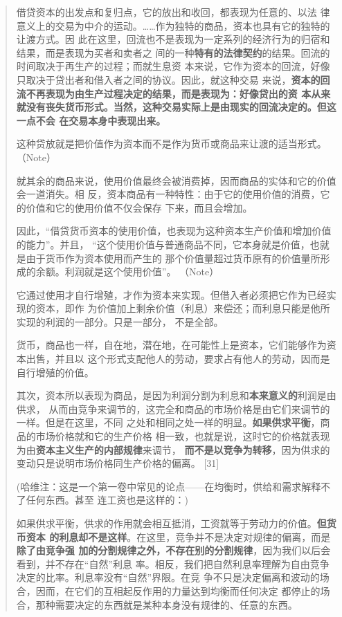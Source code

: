 \begin{quotation}借贷资本的出发点和复归点，它的放出和收回，都表现为任意的、以法
律意义上的交易为中介的运动。……作为独特的商品，资本也具有它的独特的让渡方式。因
此在这里，回流也不是表现为一定系列的经济行为的归宿和结果，而是表现为买者和卖者之
间的一种\textbf{特有的法律契约}的结果。回流的时间取决于再生产的过程；而就生息资
本来说，它作为资本的回流，好像只取决于贷出者和借入者之间的协议。因此，就这种交易
来说，\textbf{资本的回流不再表现为由生产过程决定的结果，而是表现为：好像贷出的资
本从来就没有丧失货币形式。当然，这种交易实际上是由现实的回流决定的。但这一点不会
在交易本身中表现出来。}

这种贷放就是把价值作为资本而不是作为货币或商品来让渡的适当形式。（Note）

就其余的商品来说，使用价值最终会被消费掉，因而商品的实体和它的价值会一道消失。相
反，资本商品有一种特性：由于它的使用价值的消费，它的价值和它的使用价值不仅会保存
下来，而且会增加。

因此，“借贷货币资本的使用价值，也表现为这种资本生产价值和增加价值的能力”。并且，
“这个使用价值与普通商品不同，它本身就是价值，也就是由于货币作为资本使用而产生的
那个价值量超过货币原有的价值量所形成的余额。利润就是这个使用价值”。
 （Note）

它通过使用才自行增殖，才作为资本来实现。但借入者必须把它作为已经实现的资本，即作
为价值加上剩余价值（利息）来偿还；而利息只能是他所实现的利润的一部分。只是一部分，
不是全部。

货币，商品也一样，自在地，潜在地，在可能性上是资本，它们能够作为资本出售，并且以
这个形式支配他人的劳动，要求占有他人的劳动，因而是自行增殖的价值。

其次，资本所以表现为商品，是因为利润分割为利息和\textbf{本来意义的}利润是由供求，
从而由竞争来调节的，这完全和商品的市场价格是由它们来调节的一样。但是在这里，不同
之处和相同之处一样的明显。\textbf{如果供求平衡}，商品的市场价格就和它的生产价格
相一致，也就是说，这时它的价格就表现为由\textbf{资本主义生产的内部规律}来调节，
\textbf{而不是以竞争为转移}，因为供求的变动只是说明市场价格同生产价格的偏离。
[31]

(哈维注：这是一个第一卷中常见的论点——在均衡时，供给和需求解释不了任何东西。甚至
连工资也是这样的：)

如果供求平衡，供求的作用就会相互抵消，工资就等于劳动力的价值。\textbf{但货币资本
的利息却不是这样}。在这里，竞争并不是决定对规律的偏离，而是\textbf{除了由竞争强
加的分割规律之外，不存在别的分割规律}，因为我们以后会看到，并不存在“自然”利息
率。相反，我们把自然利息率理解为自由竞争决定的比率。利息率没有“自然”界限。在竞
争不只是决定偏离和波动的场合，因而，在它们的互相起反作用的力量达到均衡而任何决定
都停止的场合，那种需要决定的东西就是某种本身没有规律的、任意的东西。

\end{quotation}

